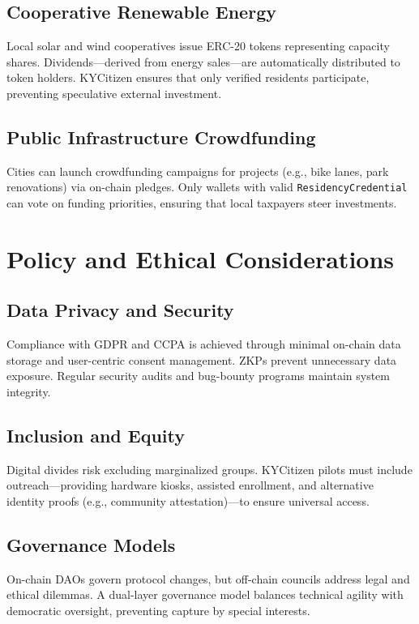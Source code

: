 \documentclass[11pt]{article}
\begin{document}
\subsection{Cooperative Renewable Energy}
Local solar and wind cooperatives issue ERC-20 tokens representing capacity shares. Dividends—derived from energy sales—are automatically distributed to token holders. KYCitizen ensures that only verified residents participate, preventing speculative external investment.

\subsection{Public Infrastructure Crowdfunding}
Cities can launch crowdfunding campaigns for projects (e.g., bike lanes, park renovations) via on-chain pledges. Only wallets with valid \texttt{ResidencyCredential} can vote on funding priorities, ensuring that local taxpayers steer investments.

\section{Policy and Ethical Considerations}
\subsection{Data Privacy and Security}
Compliance with GDPR and CCPA is achieved through minimal on-chain data storage and user-centric consent management. ZKPs prevent unnecessary data exposure. Regular security audits and bug-bounty programs maintain system integrity.

\subsection{Inclusion and Equity}
Digital divides risk excluding marginalized groups. KYCitizen pilots must include outreach—providing hardware kiosks, assisted enrollment, and alternative identity proofs (e.g., community attestation)—to ensure universal access.

\subsection{Governance Models}
On-chain DAOs govern protocol changes, but off-chain councils address legal and ethical dilemmas. A dual-layer governance model balances technical agility with democratic oversight, preventing capture by special interests.
\end{document}
